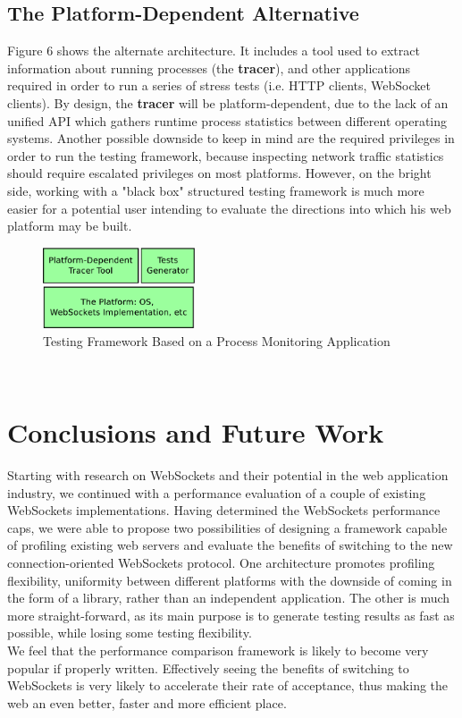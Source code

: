 \documentclass[conference]{IEEEtran}
\begin{document}
\subsection{The Platform-Dependent Alternative}
Figure 6 shows the alternate architecture. It includes a tool used to extract
information about running processes (the \textbf{tracer}), and other applications
required in order to run a series of stress tests (i.e. HTTP clients, WebSocket
clients). By design, the \textbf{tracer} will be platform-dependent, due to the
lack of an unified API which gathers runtime process statistics between different
operating systems. Another possible downside to keep in mind are the required
privileges in order to run the testing framework, because inspecting network
traffic statistics should require escalated privileges on most platforms. However,
on the bright side, working with a "black box" structured testing framework is
much more easier for a potential user intending to evaluate the directions into
which his web platform may be built.
\begin{frame}{}
  \begin{figure}
    \centering
    \includegraphics[width=0.4\textwidth]{img/architecture2.pdf}
    \caption{Testing Framework Based on a Process Monitoring Application}
  \end{figure}
\end{frame}
\\

\section{Conclusions and Future Work}
Starting with research on WebSockets and their potential in the web application
industry, we continued with a performance evaluation of a couple of existing
WebSockets implementations. Having determined the WebSockets performance caps,
we were able to propose two possibilities of designing a framework capable of
profiling existing web servers and evaluate the benefits of switching to the new 
connection-oriented WebSockets protocol. One architecture promotes profiling
flexibility, uniformity between different platforms with the downside of coming in
the form of a library, rather than an independent application. The other is much
more straight-forward, as its main purpose is to generate testing results as fast
as possible, while losing some testing flexibility.
\\

We feel that the performance comparison framework is likely to become very popular
if properly written. Effectively seeing the benefits of switching to WebSockets
is very likely to accelerate their rate of acceptance, thus making the web an
even better, faster and more efficient place.

{}

\end{document}

